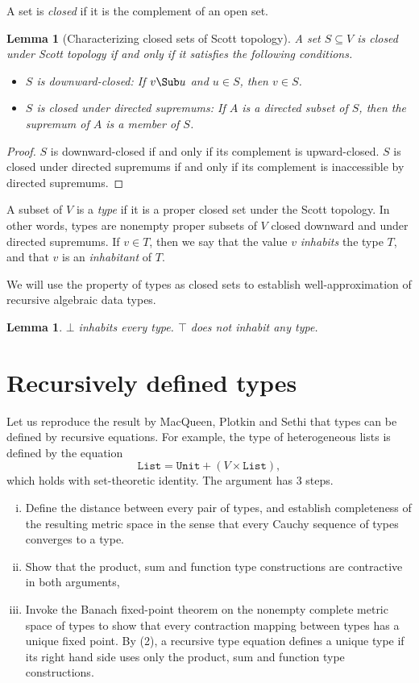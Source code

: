 \documentclass{amsart}
\newtheorem{lemma}[subsection]{Lemma}
\begin{document}
A set is \emph{closed} if it is the complement of an open set.

\begin{lemma}[Characterizing closed sets of Scott topology]
A set $S\subseteq V$ is closed under Scott topology if and
only if it satisfies the following conditions.
\begin{itemize}
\item $S$ is \emph{downward-closed}: If $v\Sub u$ and $u\in S$,
then $v\in S$.
\item $S$ is \emph{closed under directed supremums}: If
$A$ is a directed subset of $S$, then the supremum of $A$ is a
member of $S$.
\end{itemize}
\end{lemma}

\begin{proof}
$S$ is downward-closed if and only if its complement is
upward-closed. $S$ is closed under directed supremums if and only
if its complement is inaccessible by directed supremums.
\end{proof}


A subset of $V$ is a \emph{type} if it is a proper closed set
under the Scott topology. In other words, types are nonempty
proper subsets of $V$ closed downward and under directed
supremums. If $v\in T$, then we say that the value $v$
\emph{inhabits} the type $T$, and that $v$ is an
\emph{inhabitant} of $T$.

We will use the property of types as closed sets to establish
well-approximation of recursive algebraic data types.

\begin{lemma}
$\bot$ inhabits every type. $\top$ does not inhabit any type.
\end{lemma}

\section{Recursively defined types}


Let us reproduce the result by MacQueen, Plotkin and Sethi that
types can be defined by recursive equations. For example, the
type of heterogeneous lists is defined by the equation
\[
\texttt{List} = \texttt{Unit} + (V \times \texttt{List}),
\]
which holds with set-theoretic identity. The argument has 3
steps.
\begin{enumerate}[(i)]
\item Define the distance between every pair of types, and
establish completeness of the resulting metric space in the sense
that every Cauchy sequence of types converges to a type.
\item Show that the product, sum and function type constructions
are contractive in both arguments,
\item Invoke the Banach fixed-point theorem on the nonempty
complete metric space of types to show that every contraction
mapping between types has a unique fixed point. By (2), a
recursive type equation defines a unique type if its right hand
side uses only the product, sum and function type constructions.
\end{enumerate}
\end{document}
